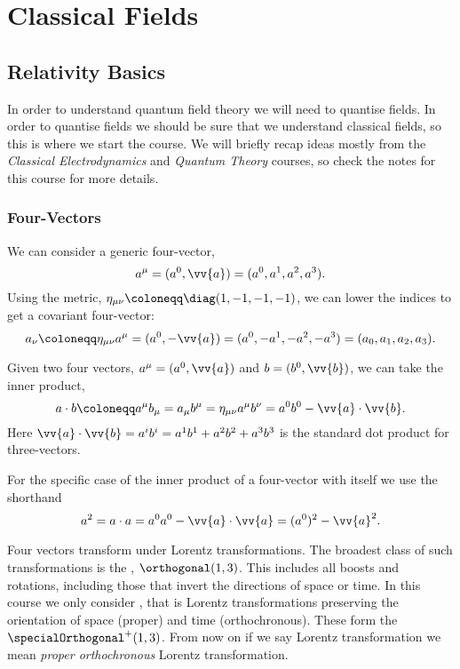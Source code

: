 \documentclass[fleqn]{NotesClass}
\newcommand*{\course}[1]{\textit{#1}}
\newcommand{\minkowskiMetric}{\eta}
\begin{document}
    \chapter{Classical Fields}
    \section{Relativity Basics}
    In order to understand quantum field theory we will need to quantise fields.
    In order to quantise fields we should be sure that we understand classical fields, so this is where we start the course.
    We will briefly recap ideas mostly from the \course{Classical Electrodynamics} and \course{Quantum Theory} courses, so check the notes for this course for more details.
    
    \subsection{Four-Vectors}
    We can consider a generic four-vector,
    \begin{equation}
        a^\mu = (a^0, \vv{a}) = (a^0, a^1, a^2, a^3).
    \end{equation}
    Using the metric, \(\minkowskiMetric_{\mu\nu} \coloneqq \diag(1,-1,-1,-1)\), we can lower the indices to get a covariant four-vector:
    \begin{equation}
        a_\nu \coloneqq \minkowskiMetric_{\mu\nu}a^\mu = (a^0, -\vv{a}) = (a^0, -a^1, -a^2, -a^3) = (a_0, a_1, a_2, a_3).
    \end{equation}

    Given two four vectors, \(a^\mu = (a^0, \vv{a})\) and \(b = (b^0, \vv{b})\), we can take the inner product,
    \begin{equation}
        a \cdot b \coloneqq a^\mu b_\mu = a_\mu b^\mu = \minkowskiMetric_{\mu\nu} a^\mu b^\nu = a^0b^0 - \vv{a} \cdot \vv{b}.
    \end{equation}
    Here \(\vv{a} \cdot \vv{b} = a^ib^i = a^1b^1 + a^2b^2 + a^3b^3\) is the standard dot product for three-vectors.
    
    For the specific case of the inner product of a four-vector with itself we use the shorthand
    \begin{equation}
        a^2 = a \cdot a = a^0 a^0 - \vv{a} \cdot \vv{a} = (a^0)^2 - \vv{a}^2 .
    \end{equation}
    
    Four vectors transform under Lorentz transformations.
    The broadest class of such transformations is the , \(\orthogonal(1, 3)\).
    This includes all boosts and rotations, including those that invert the directions of space or time.
    In this course we only consider , that is Lorentz transformations preserving the orientation of space (proper) and time (orthochronous).
    These form the  \(\specialOrthogonal^+(1, 3)\).
    From now on if we say Lorentz transformation we mean \emph{proper orthochronous} Lorentz transformation.
    
\end{document}
